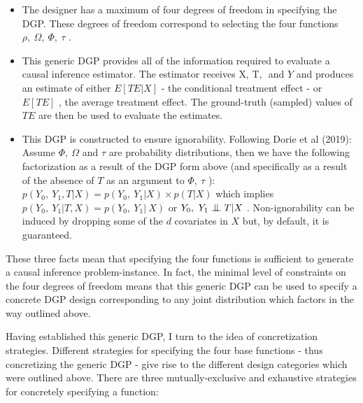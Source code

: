 \documentclass[../main.tex]{subfiles}
\begin{document}
\vspace{\baselineskip}
\begin{itemize}
    \item The designer has a maximum of four degrees of freedom in specifying the DGP. These degrees of freedom correspond to selecting the four functions  \(  \rho ,~ \Omega ,~ \Phi ,~ \tau \) .\par


\vspace{\baselineskip}
    \item This generic DGP provides all of the information required to evaluate a causal inference estimator. The estimator receives  \( \text{X, T, } \) and \( Y \) and produces an estimate of either  \( E \left[ TE  \vert  X \right]  \)  - the conditional treatment effect - or  \( E \left[ TE \right]  \) , the average treatment effect. The ground-truth (sampled) values of  \( TE \) are then be used to evaluate the estimates. \par


\vspace{\baselineskip}
    \item This DGP is constructed to ensure ignorability. Following Dorie et al (2019): Assume  \(  \Phi ,~ \Omega  \)  and  \(  \tau \) are probability distributions, then we have the following factorization as a result of the DGP form above (and specifically as a result of the absence of  \( T \) as an argument to  \(  \Phi ,~ \tau \) ):  \( p \left( Y_{0},~Y_{1}, T  \vert  X \right)  = p \left( Y_{0},~Y_{1} \vert  X \right)  \times p \left( T \vert X \right)  \)  which implies  \(  p \left( Y_{0},~Y_{1} \vert  T, X \right)  = p \left( Y_{0},~Y_{1} \vert ~ X \right)  \)  or  \( Y_{0},~Y_{1} \bigCI T  \vert  X \) . Non-ignorability can be induced by dropping some of the  \( d \)  covariates in  \( X \)  but, by default, it is guaranteed.
\end{itemize}\par


\vspace{\baselineskip}
These three facts mean that specifying the four functions is sufficient to generate a causal inference problem-instance. In fact, the minimal level of constraints on the four degrees of freedom means that this generic DGP can be used to specify a concrete DGP design corresponding to any joint distribution which factors in the way outlined above.\par


\vspace{\baselineskip}
Having established this generic DGP, I turn to the idea of concretization strategies. Different strategies for specifying the four base functions - thus concretizing the generic DGP - give rise to the different design categories which were outlined above. There are three mutually-exclusive and exhaustive strategies for concretely specifying a function:\par
\end{document}
